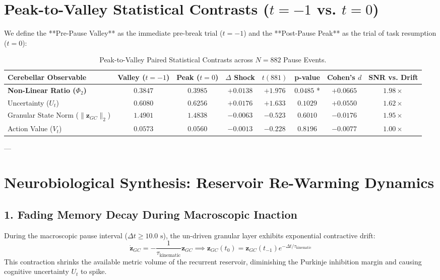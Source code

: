 \documentclass[11pt,twoside,a4paper]{article}
\begin{document}
\section{Peak-to-Valley Statistical Contrasts ($t=-1$ vs. $t=0$)}

We define the **Pre-Pause Valley** as the immediate pre-break trial ($t = -1$) and the **Post-Pause Peak** as the trial of task resumption ($t = 0$):

\begin{table}[H]
\centering
\caption{Peak-to-Valley Paired Statistical Contrasts across $N=882$ Pause Events.}
\label{tab:peak_valley}
\vspace{0.4em}
\small
\begin{tabular}{l c c c c c c c}
\toprule
\textbf{Cerebellar Observable} & \textbf{Valley ($t=-1$)} & \textbf{Peak ($t=0$)} & \textbf{$\Delta$ Shock} & \textbf{$t(881)$} & \textbf{p-value} & \textbf{Cohen's $d$} & \textbf{SNR vs. Drift} \\
\midrule
\textbf{Non-Linear Ratio ($\Phi_2$)} & $\mathbf{0.3847}$ & $\mathbf{0.3985}$ & $\mathbf{+0.0138}$ & $\mathbf{+1.976}$ & $\mathbf{0.0485}$ * & $\mathbf{+0.0665}$ & $\mathbf{1.98\times}$ \\
Uncertainty ($U_t$) & $0.6080$ & $0.6256$ & $+0.0176$ & $+1.633$ & $0.1029$ & $+0.0550$ & $1.62\times$ \\
Granular State Norm ($\|\mathbf{z}_{GC}\|_2$) & $1.4901$ & $1.4838$ & $-0.0063$ & $-0.523$ & $0.6010$ & $-0.0176$ & $1.95\times$ \\
Action Value ($V_t$) & $0.0573$ & $0.0560$ & $-0.0013$ & $-0.228$ & $0.8196$ & $-0.0077$ & $1.00\times$ \\
\bottomrule
\end{tabular}
\end{table}

---

\section{Neurobiological Synthesis: Reservoir Re-Warming Dynamics}

\subsection{1. Fading Memory Decay During Macroscopic Inaction}
During the macroscopic pause interval ($\Delta t \ge 10.0\text{ s}$), the un-driven granular layer exhibits exponential contractive drift:
\begin{equation}
\dot{\mathbf{z}}_{GC} = -\frac{1}{\tau_{\text{kinematic}}} \mathbf{z}_{GC} \implies \mathbf{z}_{GC}(t_0) = \mathbf{z}_{GC}(t_{-1}) e^{-\Delta t / \tau_{\text{kinematic}}}
\end{equation}
This contraction shrinks the available metric volume of the recurrent reservoir, diminishing the Purkinje inhibition margin and causing cognitive uncertainty $U_t$ to spike.
\end{document}

